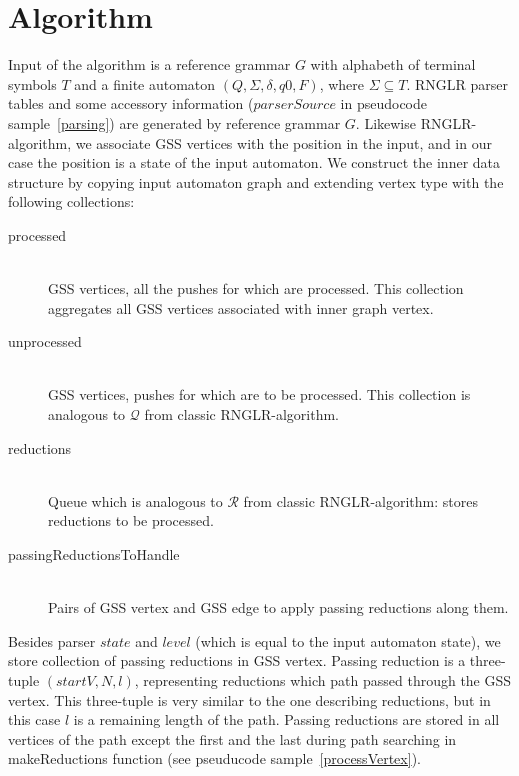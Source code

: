 \documentclass{llncs}
\begin{document}
\section{Algorithm}
Input of the algorithm is a reference grammar $G$ with alphabeth of terminal symbols $T$ 
and a finite automaton $(Q, \Sigma, \delta, q0, F)$, where 
$\Sigma \subseteq T$. RNGLR parser tables and some accessory information ($parserSource$ 
in pseudocode sample~\ref{parsing}) are generated by reference grammar $G$. 
Likewise RNGLR-algorithm, we associate GSS vertices with the position in the input,
and in our case the position is a state of the input automaton. We construct the inner 
data structure by copying input automaton graph and extending vertex type with 
the following collections: 
\begin{description}
  \item[processed] \hfill \\ GSS vertices, all the pushes for which are processed. 
                             This collection aggregates all GSS vertices associated with inner graph vertex.
  \item[unprocessed] \hfill \\ GSS vertices, pushes for which are to be processed. 
                               This collection is analogous to $\mathcal{Q}$ from classic RNGLR-algorithm.
  \item[reductions] \hfill \\ Queue which is analogous to $\mathcal{R}$ from classic RNGLR-algorithm: 
                              stores reductions to be processed.
  \item[passingReductionsToHandle] \hfill \\ Pairs of GSS vertex and GSS edge to apply passing reductions along them.
\end{description}

Besides parser $state$ and $level$ (which is equal to the input automaton state), 
we store collection of passing reductions in GSS vertex. Passing reduction is a 
three-tuple $(startV, N, l)$, representing reductions which path passed through 
the GSS vertex. This three-tuple is very similar to the one describing reductions, 
but in this case $l$ is a remaining length of the path. Passing reductions are 
stored in all vertices of the path except the first and the last during path 
searching in makeReductions function (see pseuducode sample~\ref{processVertex}).
\end{document}
